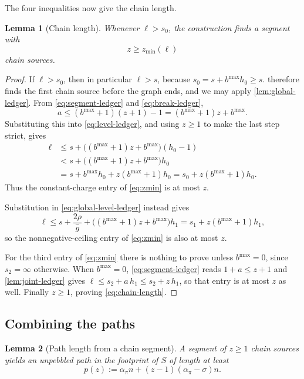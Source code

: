 \documentclass[11pt]{article}
\theoremstyle{plain}
\newtheorem{lemma}{Lemma}
\theoremstyle{remark}
\newcommand{\ghat}{\widehat g}
\begin{document}
The four inequalities now give the chain length.

\begin{lemma}[Chain length]
\label{lem:chain-length}
Whenever \(\ell>s_0\), the construction finds a segment with
\begin{equation}
 z\ge z_{\min}(\ell)
 \label{eq:chain-length}
\end{equation}
chain sources.
\end{lemma}

\begin{proof}
If \(\ell>s_0\), then in particular \(\ell>s\), because
\(s_0=s+b^{\max} h_0\ge s\).   therefore finds the
first chain source before the graph ends, and we may apply
\cref{lem:global-ledger}.  From \eqref{eq:segment-ledger} and
\eqref{eq:break-ledger},
\[
 a\le(b^{\max}+1)(z+1)-1=(b^{\max}+1)z+b^{\max} .
\]
Substituting this into \eqref{eq:level-ledger}, and using \(z\ge1\) to make the
last step strict, gives
\begin{align*}
 \ell
 &\le s+\bigl((b^{\max}+1)z+b^{\max}\bigr)(h_0-1)\\
 &<s+\bigl((b^{\max}+1)z+b^{\max}\bigr)h_0\\
 &=s+b^{\max} h_0+z(b^{\max}+1)h_0
   =s_0+z(b^{\max}+1)h_0.
\end{align*}
Thus the constant-charge entry of \eqref{eq:zmin} is at most \(z\).

Substitution in \eqref{eq:global-level-ledger} instead gives
\[
 \ell\le s+\frac{2\rho}{\ghat}+
 \bigl((b^{\max}+1)z+b^{\max}\bigr)h_1
 =s_1+z(b^{\max}+1)h_1,
\]
so the nonnegative-ceiling entry of \eqref{eq:zmin} is also at most \(z\).

For the third entry of \eqref{eq:zmin} there is nothing to prove unless
\(b^{\max}=0\), since \(s_2=\infty\) otherwise.  When \(b^{\max}=0\),
\eqref{eq:segment-ledger} reads \(1+a\le z+1\) and \cref{lem:joint-ledger} gives
\(\ell\le s_2+a\,h_1\le s_2+z\,h_1\), so that entry is at most \(z\) as well.
Finally \(z\ge1\), proving \eqref{eq:chain-length}.
\end{proof}

\subsection{Combining the paths}

\begin{lemma}[Path length from a chain segment]
\label{lem:path-payoff}
A segment of \(z\ge1\) chain sources yields an unpebbled path in the footprint of \(S\)
of length at least
\begin{equation}
 p(z):=\alpha_\pi n+(z-1)(\alpha_\pi-\sigma)n.
 \label{eq:segment-payoff}
\end{equation}
\end{lemma}
\end{document}
